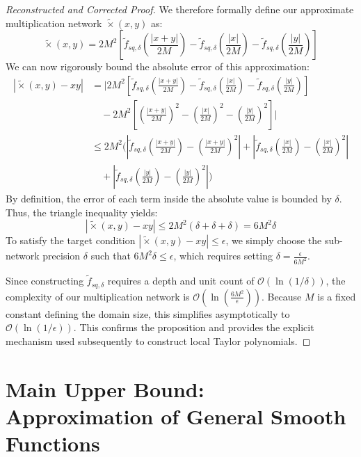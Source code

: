 \documentclass[12pt]{article}
\begin{document}
\begin{proof}[Reconstructed and Corrected Proof]
We therefore formally define our approximate multiplication network $\tilde{\times}(x,y)$ as:
\begin{equation}
\tilde{\times}(x,y) = 2M^2 \left[ \tilde{f}_{sq, \delta}\left(\frac{|x+y|}{2M}\right) - \tilde{f}_{sq, \delta}\left(\frac{|x|}{2M}\right) - \tilde{f}_{sq, \delta}\left(\frac{|y|}{2M}\right) \right]
\end{equation}
We can now rigorously bound the absolute error of this approximation:
\begin{align}
|\tilde{\times}(x,y) - xy| &= \Bigg| 2M^2 \left[ \tilde{f}_{sq, \delta}\left(\frac{|x+y|}{2M}\right) - \tilde{f}_{sq, \delta}\left(\frac{|x|}{2M}\right) - \tilde{f}_{sq, \delta}\left(\frac{|y|}{2M}\right) \right] \nonumber \\
&\quad - 2M^2 \left[ \left(\frac{|x+y|}{2M}\right)^2 - \left(\frac{|x|}{2M}\right)^2 - \left(\frac{|y|}{2M}\right)^2 \right] \Bigg| \nonumber \\
&\le 2M^2 \Bigg( \left| \tilde{f}_{sq, \delta}\left(\frac{|x+y|}{2M}\right) - \left(\frac{|x+y|}{2M}\right)^2 \right| + \left| \tilde{f}_{sq, \delta}\left(\frac{|x|}{2M}\right) - \left(\frac{|x|}{2M}\right)^2 \right| \nonumber \\
&\quad + \left| \tilde{f}_{sq, \delta}\left(\frac{|y|}{2M}\right) - \left(\frac{|y|}{2M}\right)^2 \right| \Bigg)
\end{align}
By definition, the error of each term inside the absolute value is bounded by $\delta$. Thus, the triangle inequality yields:
\begin{equation}
|\tilde{\times}(x,y) - xy| \le 2M^2 (\delta + \delta + \delta) = 6M^2 \delta
\end{equation}
To satisfy the target condition $|\tilde{\times}(x,y) - xy| \le \epsilon$, we simply choose the sub-network precision $\delta$ such that $6M^2 \delta \le \epsilon$, which requires setting $\delta = \frac{\epsilon}{6M^2}$. 

Since constructing $\tilde{f}_{sq, \delta}$ requires a depth and unit count of $\mathcal{O}(\ln(1/\delta))$, the complexity of our multiplication network is $\mathcal{O}\left(\ln\left(\frac{6M^2}{\epsilon}\right)\right)$. Because $M$ is a fixed constant defining the domain size, this simplifies asymptotically to $\mathcal{O}(\ln(1/\epsilon))$. This confirms the proposition and provides the explicit mechanism used subsequently to construct local Taylor polynomials.
\end{proof}



\section{Main Upper Bound: Approximation of General Smooth Functions}
\end{document}
